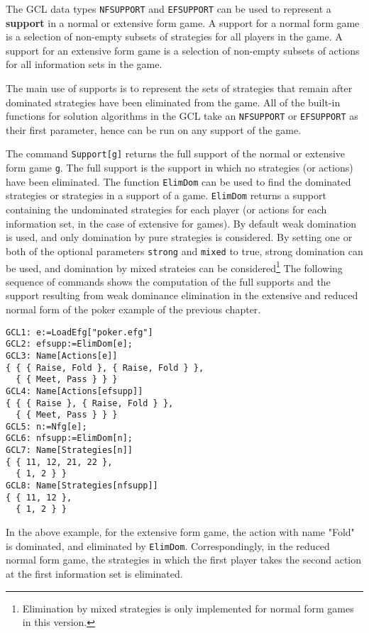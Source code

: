 The GCL data types \verb+NFSUPPORT+ and \verb+EFSUPPORT+ can be used
to represent a {\bf support} in a normal or extensive form game.  A
support for a normal form game is a selection of non-empty subsets of
strategies for all players in the game.  A support for an extensive
form game is a selection of non-empty subsets of actions for all
information sets in the game.  

The main use of supports is to represent the sets of strategies that
remain after dominated strategies have been eliminated from the game.
All of the built-in functions for solution algorithms in the GCL take
an \verb+NFSUPPORT+ or \verb+EFSUPPORT+ as their first parameter,
hence can be run on any support of the game.

The command \verb+Support[g]+ returns the full support of the normal
or extensive form game \verb+g+.  The full support is the support in
which no strategies (or actions) have been eliminated.  The function
\verb+ElimDom+ can be used to find the dominated strategies or
strategies in a support of a game.  \verb+ElimDom+ returns a support
containing the undominated strategies for each player (or actions for
each information set, in the case of extensive for games).  By default
weak domination is used, and only domination by pure strategies is
considered. By setting one or both of the optional parameters
\verb+strong+ and \verb+mixed+ to true, strong domination can be used,
and domination by mixed strateies can be
considered\footnote{Elimination by mixed strategies is only implemented
for normal form games in this version.}  The following sequence of
commands shows the computation of the full supports and the support
resulting from weak dominance elimination in the extensive and reduced
normal form of the poker example of the previous chapter.

\begin{verbatim}
GCL1: e:=LoadEfg["poker.efg"]
GCL2: efsupp:=ElimDom[e];
GCL3: Name[Actions[e]]
{ { { Raise, Fold }, { Raise, Fold } },
  { { Meet, Pass } } }
GCL4: Name[Actions[efsupp]]
{ { { Raise }, { Raise, Fold } },
  { { Meet, Pass } } }
GCL5: n:=Nfg[e];
GCL6: nfsupp:=ElimDom[n];
GCL7: Name[Strategies[n]]
{ { 11, 12, 21, 22 },
  { 1, 2 } }
GCL8: Name[Strategies[nfsupp]]
{ { 11, 12 },
  { 1, 2 } }
\end{verbatim}

In the above example, for the extensive form game, the action with
name "Fold" is dominated, and eliminated by \verb+ElimDom+.
Correspondingly, in the reduced normal form game, the strategies in
which the first player takes the second action at the first
information set is eliminated.  

